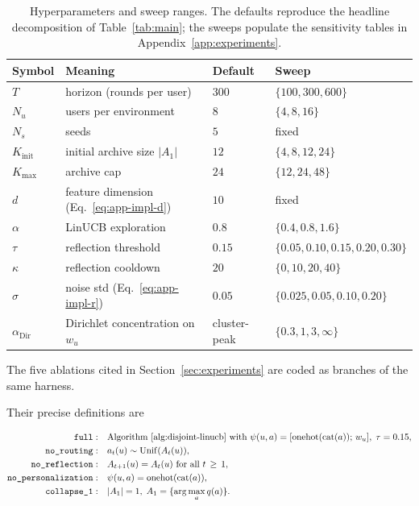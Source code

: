 \documentclass{article} %
\begin{document}
\begin{table}[h]
\centering
\small
\begin{tabular}{llll}
\toprule
Symbol & Meaning & Default & Sweep \\
\midrule
$T$ & horizon (rounds per user) & $300$ & $\{100, 300, 600\}$ \\
$N_u$ & users per environment & $8$ & $\{4, 8, 16\}$ \\
$N_s$ & seeds & $5$ & fixed \\
$K_{\text{init}}$ & initial archive size $|A_1|$ & $12$ & $\{4, 8, 12, 24\}$ \\
$K_{\max}$ & archive cap & $24$ & $\{12, 24, 48\}$ \\
$d$ & feature dimension (Eq.~\eqref{eq:app-impl-d}) & $10$ & fixed \\
$\alpha$ & LinUCB exploration & $0.8$ & $\{0.4, 0.8, 1.6\}$ \\
$\tau$ & reflection threshold & $0.15$ & $\{0.05, 0.10, 0.15, 0.20, 0.30\}$ \\
$\kappa$ & reflection cooldown & $20$ & $\{0, 10, 20, 40\}$ \\
$\sigma$ & noise std (Eq.~\eqref{eq:app-impl-r}) & $0.05$ & $\{0.025, 0.05, 0.10, 0.20\}$ \\
$\alpha_{\mathrm{Dir}}$ & Dirichlet concentration on $w_u$ & cluster-peak & $\{0.3, 1, 3, \infty\}$ \\
\bottomrule
\end{tabular}
\caption{Hyperparameters and sweep ranges. The defaults reproduce the headline decomposition of Table~\ref{tab:main}; the sweeps populate the sensitivity tables in Appendix~\ref{app:experiments}.}
\label{tab:app-impl-hparams}
\end{table}

The five ablations cited in Section~\ref{sec:experiments} are coded as branches of the same harness.

Their precise definitions are

\begin{align}
\label{eq:app-impl-abl-full}
\texttt{full} :&\quad \text{Algorithm~\ref{alg:disjoint-linucb} with } \psi(u,a) = [\mathrm{onehot}(\mathrm{cat}(a));\, w_u],\; \tau=0.15,\\
\label{eq:app-impl-abl-noroute}
\texttt{no\_routing} :&\quad a_t(u) \sim \mathrm{Unif}(A_t(u)),\\
\label{eq:app-impl-abl-noref}
\texttt{no\_reflection} :&\quad A_{t+1}(u) = A_t(u) \text{ for all } t \,\ge\, 1,\\
\label{eq:app-impl-abl-nopers}
\texttt{no\_personalization} :&\quad \psi(u,a) = \mathrm{onehot}(\mathrm{cat}(a)),\\
\label{eq:app-impl-abl-coll1}
\texttt{collapse\_1} :&\quad |A_1| = 1,\; A_1 = \{\arg\max_{a} q(a)\}.
\end{align}
\end{document}
